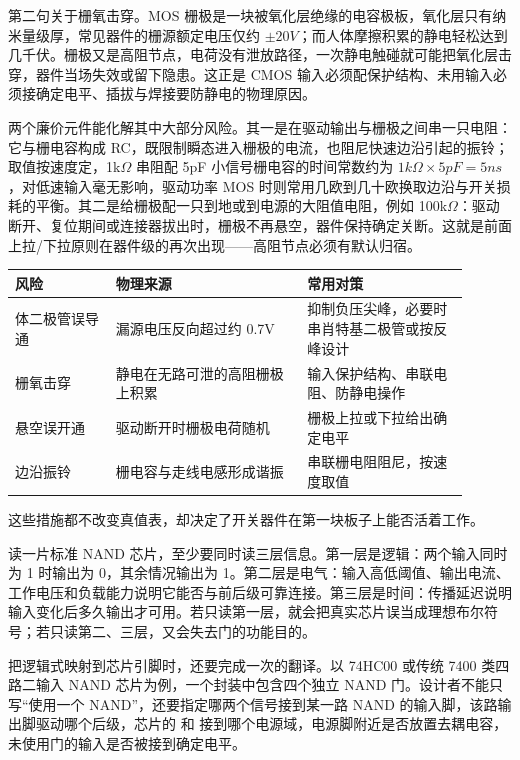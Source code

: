 第二句关于栅氧击穿。MOS 栅极是一块被氧化层绝缘的电容极板，氧化层只有纳米量级厚，常见器件的栅源额定电压仅约 $\pm 20V$；而人体摩擦积累的静电轻松达到几千伏。栅极又是高阻节点，电荷没有泄放路径，一次静电触碰就可能把氧化层击穿，器件当场失效或留下隐患。这正是 CMOS 输入必须配保护结构、未用输入必须接确定电平、插拔与焊接要防静电的物理原因。

两个廉价元件能化解其中大部分风险。其一是在驱动输出与栅极之间串一只电阻：它与栅电容构成 RC，既限制瞬态进入栅极的电流，也阻尼快速边沿引起的振铃；取值按速度定，1k$\Omega$ 串阻配 5pF 小信号栅电容的时间常数约为 $1k\Omega \times 5pF = 5ns$，对低速输入毫无影响，驱动功率 MOS 时则常用几欧到几十欧换取边沿与开关损耗的平衡。其二是给栅极配一只到地或到电源的大阻值电阻，例如 100k$\Omega$：驱动断开、复位期间或连接器拔出时，栅极不再悬空，器件保持确定关断。这就是前面上拉/下拉原则在器件级的再次出现——高阻节点必须有默认归宿。

\begin{longtable}{L{0.2\linewidth}L{0.38\linewidth}L{0.32\linewidth}}
\toprule
风险 & 物理来源 & 常用对策 \\
\midrule
体二极管误导通 & 漏源电压反向超过约 0.7V & 抑制负压尖峰，必要时串肖特基二极管或按反峰设计 \\\tablerowrule
栅氧击穿 & 静电在无路可泄的高阻栅极上积累 & 输入保护结构、串联电阻、防静电操作 \\\tablerowrule
悬空误开通 & 驱动断开时栅极电荷随机 & 栅极上拉或下拉给出确定电平 \\\tablerowrule
边沿振铃 & 栅电容与走线电感形成谐振 & 串联栅电阻阻尼，按速度取值 \\
\bottomrule
\end{longtable}

这些措施都不改变真值表，却决定了开关器件在第一块板子上能否活着工作。

\begin{chipcase}
读一片标准 NAND 芯片，至少要同时读三层信息。第一层是逻辑：两个输入同时为 1 时输出为 0，其余情况输出为 1。第二层是电气：输入高低阈值、输出电流、工作电压和负载能力说明它能否与前后级可靠连接。第三层是时间：传播延迟说明输入变化后多久输出才可用。若只读第一层，就会把真实芯片误当成理想布尔符号；若只读第二、三层，又会失去门的功能目的。
\end{chipcase}

把逻辑式映射到芯片引脚时，还要完成一次的翻译。以 74HC00 或传统 7400 类四路二输入 NAND 芯片为例，一个封装中包含四个独立 NAND 门。设计者不能只写“使用一个 NAND”，还要指定哪两个信号接到某一路 NAND 的输入脚，该路输出脚驱动哪个后级，芯片的  和  接到哪个电源域，电源脚附近是否放置去耦电容，未使用门的输入是否被接到确定电平。

